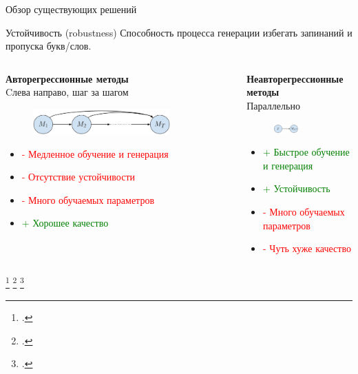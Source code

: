\begin{frame}{Обзор существующих решений}
\begin{block}{Устойчивость (robustness)}
    Способность процесса генерации избегать запинаний и пропуска букв/слов.
\end{block}
\vspace{-0.5cm}
\begin{columns}[T]
\begin{column}{0.5\textwidth}
\begin{center}
\renewcommand{\thefootnote}{1,2}
\textbf{Авторегрессионные методы}\footnotemark\\
Cлева направо, шаг за шагом
\end{center}
\begin{figure}[H]
\centering
\includegraphics[width=0.8\textwidth]{images/methods/areg.png}
\end{figure}
\begin{itemize}
    \item[] \textcolor{red}{- Медленное обучение и генерация}
    \item[] \textcolor{red}{- Отсутствие устойчивости}
    \item[] \textcolor{red}{- Много обучаемых параметров}
    \item[] \textcolor{green}{+ Хорошее качество}
\end{itemize}
\end{column}
\begin{column}{0.5\textwidth}
\begin{center}
\renewcommand{\thefootnote}{3}
\textbf{Неавторегрессионные методы}\footnotemark\\
Параллельно
\end{center}
\begin{figure}[H]
\centering
\includegraphics[width=0.47\textwidth]{images/methods/nareg.png}
\end{figure}
\begin{itemize}
    \item[] \textcolor{green}{+ Быстрое обучение и генерация}
    \item[] \textcolor{green}{+ Устойчивость}
    \item[] \textcolor{red}{- Много обучаемых параметров}
    \item[] \textcolor{red}{- Чуть хуже качество}
\end{itemize}
\end{column}
\end{columns}
\renewcommand{\thefootnote}{1}
\footcitetext{tacotron2}
\renewcommand{\thefootnote}{2}
\footcitetext{transformer-tts}
\renewcommand{\thefootnote}{3}
\footcitetext{fastspeech}
\end{frame}

